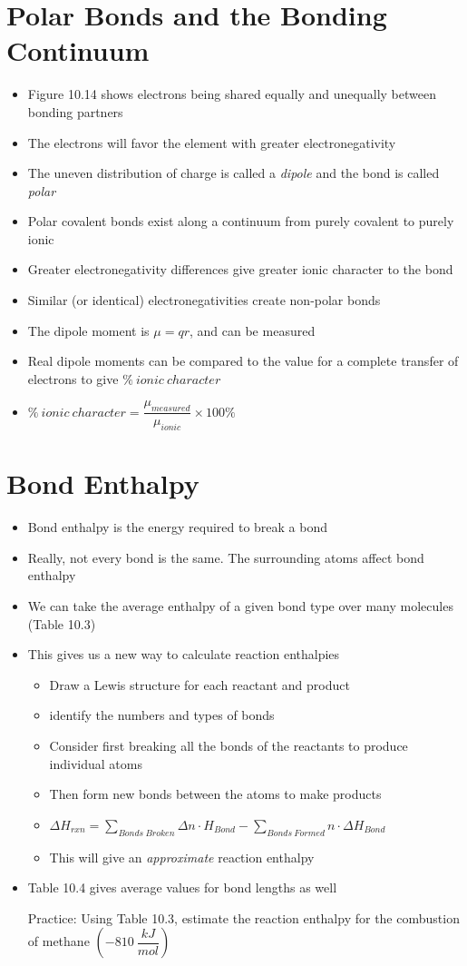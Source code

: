 \documentclass[12pt, openany, letterpaper]{memoir}
\begin{document}
\section{Polar Bonds and the Bonding Continuum}
\begin{itemize}
	\item Figure 10.14 shows electrons being shared equally and unequally between bonding partners
	\item The electrons will favor the element with greater electronegativity
	\item The uneven distribution of charge is called a \emph{dipole} and the bond is called \emph{polar}
	\item Polar covalent bonds exist along a continuum from purely covalent to purely ionic
	\item Greater electronegativity differences give greater ionic character to the bond
	\item Similar (or identical) electronegativities create non-polar bonds
	\item The dipole moment is $\mu=qr$, and can be measured
	\item Real dipole moments can be compared to the value for a complete transfer of electrons to give $\%~ionic~character$
	\item $\%~ionic~character=\dfrac{\mu_{measured}}{\mu_{ionic}}\times100\%$
\end{itemize}
\section{Bond Enthalpy}
\begin{itemize}
	\item Bond enthalpy is the energy required to break a bond
	\item Really, not every  bond is the same. The surrounding atoms affect bond enthalpy
	\item We can take the average enthalpy of a given bond type over many molecules (Table 10.3)
	\item This gives us a new way to calculate reaction enthalpies
	      \begin{itemize}
		      \item Draw a Lewis structure for each reactant and product
		      \item identify the numbers and types of bonds
		      \item Consider first breaking all the bonds of the reactants to produce individual atoms
		      \item Then form new bonds between the atoms to make products
		      \item $\Delta H_{rxn}=\sum\limits_{Bonds~Broken}\Delta n\cdot H_{Bond} - \sum\limits_{Bonds~Formed}n\cdot \Delta H_{Bond}$
		      \item This will give an \emph{approximate} reaction enthalpy
	      \end{itemize}
	\item Table 10.4 gives average values for bond lengths as well

	      Practice: Using Table 10.3, estimate the reaction enthalpy for the combustion of methane $\left(-810~\dfrac{kJ}{mol}\right)$
\end{itemize}
\end{document}
